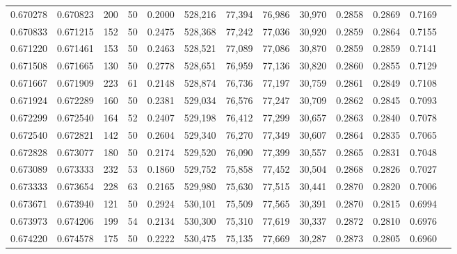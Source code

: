 \begin{tabular}{rrrrrrrrrrrrr}
0.670278 & 0.670823 &    200 &    50 &                                     0.2000 & 528,216 &  77,394 &  76,986 &  30,970 & 0.2858 & 0.2869 & 0.7169 \\
0.670833 & 0.671215 &    152 &    50 &                                     0.2475 & 528,368 &  77,242 &  77,036 &  30,920 & 0.2859 & 0.2864 & 0.7155 \\
0.671220 & 0.671461 &    153 &    50 &                                     0.2463 & 528,521 &  77,089 &  77,086 &  30,870 & 0.2859 & 0.2859 & 0.7141 \\
0.671508 & 0.671665 &    130 &    50 &                                     0.2778 & 528,651 &  76,959 &  77,136 &  30,820 & 0.2860 & 0.2855 & 0.7129 \\
0.671667 & 0.671909 &    223 &    61 &                                     0.2148 & 528,874 &  76,736 &  77,197 &  30,759 & 0.2861 & 0.2849 & 0.7108 \\
0.671924 & 0.672289 &    160 &    50 &                                     0.2381 & 529,034 &  76,576 &  77,247 &  30,709 & 0.2862 & 0.2845 & 0.7093 \\
0.672299 & 0.672540 &    164 &    52 &                                     0.2407 & 529,198 &  76,412 &  77,299 &  30,657 & 0.2863 & 0.2840 & 0.7078 \\
0.672540 & 0.672821 &    142 &    50 &                                     0.2604 & 529,340 &  76,270 &  77,349 &  30,607 & 0.2864 & 0.2835 & 0.7065 \\
0.672828 & 0.673077 &    180 &    50 &                                     0.2174 & 529,520 &  76,090 &  77,399 &  30,557 & 0.2865 & 0.2831 & 0.7048 \\
0.673089 & 0.673333 &    232 &    53 &                                     0.1860 & 529,752 &  75,858 &  77,452 &  30,504 & 0.2868 & 0.2826 & 0.7027 \\
0.673333 & 0.673654 &    228 &    63 &                                     0.2165 & 529,980 &  75,630 &  77,515 &  30,441 & 0.2870 & 0.2820 & 0.7006 \\
0.673671 & 0.673940 &    121 &    50 &                                     0.2924 & 530,101 &  75,509 &  77,565 &  30,391 & 0.2870 & 0.2815 & 0.6994 \\
0.673973 & 0.674206 &    199 &    54 &                                     0.2134 & 530,300 &  75,310 &  77,619 &  30,337 & 0.2872 & 0.2810 & 0.6976 \\
0.674220 & 0.674578 &    175 &    50 &                                     0.2222 & 530,475 &  75,135 &  77,669 &  30,287 & 0.2873 & 0.2805 & 0.6960 \\

\end{tabular}
